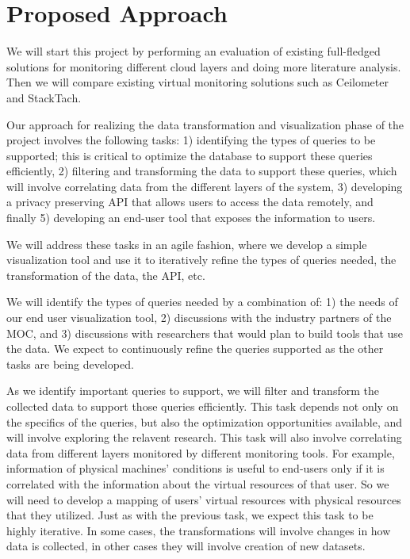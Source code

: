 \section{Proposed Approach}
\label{sec:ProposedApproach}

%

We will start this project by performing an evaluation of existing full-fledged solutions for monitoring different cloud layers and doing more literature analysis. Then we will compare existing virtual monitoring solutions such as Ceilometer and StackTach. 

Our approach for realizing the data transformation and visualization phase of the project involves the following tasks: 1) identifying the types of queries to be supported; this is critical to optimize the database to support these queries efficiently, 2) filtering and transforming the data to support these queries, which will involve correlating data from the different layers of the system, 3) developing a privacy preserving API that allows users to access the data remotely, and finally 5) developing an end-user tool that exposes the information to users.  

We will address these tasks in an agile fashion, where we develop a simple visualization tool and use it to iteratively refine the types of queries needed, the transformation of the data, the API, etc. 

We will identify the types of queries needed by a combination of: 1) the needs of our end user visualization tool, 2) discussions with the industry partners of the MOC, and 3) discussions with researchers that would plan to build tools that use the data.  We expect to continuously refine the queries supported as the other tasks are being developed. 

As we identify important queries to support, we will filter and transform the collected data to support those queries efficiently. This task depends not only on the specifics of the queries, but also the optimization opportunities available, and will involve exploring the relavent research. This task will also involve correlating data from different layers monitored by different monitoring tools. For example, information of physical machines’ conditions is useful to end-users only if it is correlated with the information about the virtual resources of that user. So we will need to develop a mapping of users’ virtual resources with physical resources that they utilized.  Just as with the previous task, we expect this task to be highly iterative.  In some cases, the transformations will involve changes in how data is collected, in other cases they will involve creation of new datasets. 

